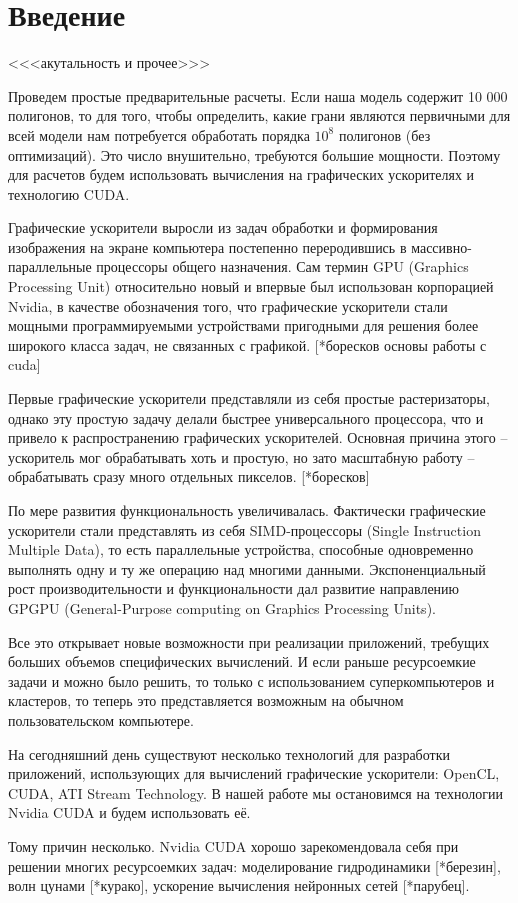 \section*{Введение}


<<<акутальность и прочее>>>

Проведем простые предварительные расчеты. Если наша модель содержит 10 000 полигонов, то для того, чтобы  определить, какие грани являются первичными для всей модели нам потребуется обработать порядка $ 10^8 $ полигонов (без оптимизаций). Это число внушительно, требуются большие мощности. Поэтому для расчетов будем использовать вычисления на графических ускорителях и технологию CUDA. 

Графические ускорители выросли из задач обработки и формирования изображения на экране компьютера постепенно переродившись в массивно-параллельные процессоры общего назначения. Сам термин GPU (Graphics Processing Unit) относительно новый и впервые был использован корпорацией Nvidia, в качестве обозначения того, что графические ускорители стали мощными программируемыми устройствами пригодными для решения более широкого класса задач, не связанных с графикой. [*боресков основы работы с cuda]

Первые графические ускорители представляли из себя простые растеризаторы, однако эту простую задачу делали быстрее универсального процессора, что и привело к распространению графических ускорителей. Основная причина этого -- ускоритель мог обрабатывать хоть и простую, но зато масштабную работу -- обрабатывать сразу много отдельных пикселов. [*боресков]

По мере развития функциональность увеличивалась. Фактически графические ускорители стали представлять из себя SIMD-процессоры (Single Instruction Multiple Data), то есть параллельные устройства, способные одновременно выполнять одну и ту же операцию над многими данными. Экспоненциальный рост производительности и функциональности дал развитие направлению GPGPU (General-Purpose computing on Graphics Processing Units). 

Все это открывает новые возможности при реализации приложений, требущих больших объемов специфических вычислений. И если раньше ресурсоемкие задачи и можно было решить, то только с использованием суперкомпьютеров и кластеров, то теперь это представляется возможным на обычном пользовательском  компьютере. 

На сегодняшний день существуют несколько технологий для разработки приложений, использующих для вычислений графические ускорители: OpenCL, CUDA, ATI Stream Technology. В нашей работе мы остановимся на технологии Nvidia CUDA и будем использовать её. 

Тому причин несколько. Nvidia CUDA хорошо зарекомендовала себя при решении многих ресурсоемких задач: моделирование гидродинамики [*березин], волн цунами [*курако], ускорение вычисления нейронных сетей [*парубец].


